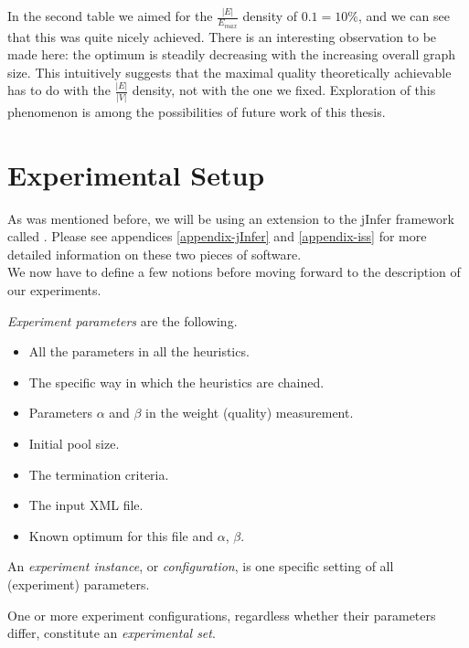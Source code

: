 In the second table we aimed for the $\frac{|E|}{E_{max}}$ density of $0.1 = 10\%$, and we can see that this was quite nicely achieved. There is an interesting observation to be made here: the optimum is steadily decreasing with the increasing overall graph size. This intuitively suggests that the maximal quality theoretically achievable has to do with the $\frac{|E|}{|V|}$ density, not with the one we fixed. Exploration of this phenomenon is among the possibilities of future work of this thesis.

\section{Experimental Setup}

As was mentioned before, we will be using an extension to the jInfer framework called . Please see appendices \ref{appendix-jInfer} and \ref{appendix-iss} for more detailed information on these two pieces of software.\\

We now have to define a few notions before moving forward to the description of our experiments.

\begin{define}
	\label{define-experiment-params}
	\textit{Experiment parameters} are the following.
	\begin{itemize}
		\item All the parameters in all the heuristics.
		\item The specific way in which the heuristics are chained.
		\item Parameters $\alpha$ and $\beta$ in the weight (quality) measurement.
		\item Initial pool size.
		\item The termination criteria.
		\item The input XML file.
		\item Known optimum for this file and $\alpha$, $\beta$.
	\end{itemize}
\end{define}

\begin{define}
	\label{define-experiment-config}
	An \textit{experiment instance}, or \textit{configuration}, is one specific setting of all (experiment) parameters.
\end{define}

\begin{define}
	\label{define-experiment-set}
	One or more experiment configurations, regardless whether their parameters differ, constitute an \textit{experimental set}.
\end{define}

